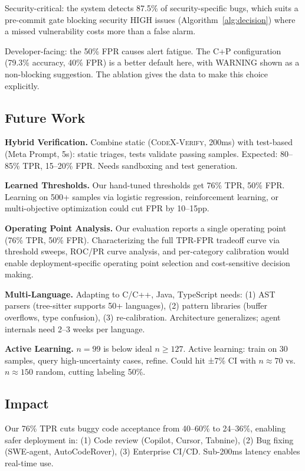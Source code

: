 \documentclass[10pt,twocolumn]{article}
\begin{document}
Security-critical: the system detects 87.5\% of security-specific bugs, which suits a pre-commit gate blocking security HIGH issues (Algorithm~\ref{alg:decision}) where a missed vulnerability costs more than a false alarm.

Developer-facing: the 50\% FPR causes alert fatigue. The C+P configuration (79.3\% accuracy, 40\% FPR) is a better default here, with WARNING shown as a non-blocking suggestion. The ablation gives the data to make this choice explicitly.

\subsection{Future Work}

\textbf{Hybrid Verification.} Combine static (\textsc{CodeX-Verify}, 200ms) with test-based (Meta Prompt, 5s): static triages, tests validate passing samples. Expected: 80--85\% TPR, 15--20\% FPR. Needs sandboxing and test generation.

\textbf{Learned Thresholds.} Our hand-tuned thresholds get 76\% TPR, 50\% FPR. Learning on 500+ samples via logistic regression, reinforcement learning, or multi-objective optimization could cut FPR by 10--15pp.

\textbf{Operating Point Analysis.} Our evaluation reports a single operating point (76\% TPR, 50\% FPR). Characterizing the full TPR-FPR tradeoff curve via threshold sweeps, ROC/PR curve analysis, and per-category calibration would enable deployment-specific operating point selection and cost-sensitive decision making.

\textbf{Multi-Language.} Adapting to C/C++, Java, TypeScript needs: (1) AST parsers (tree-sitter supports 50+ languages), (2) pattern libraries (buffer overflows, type confusion), (3) re-calibration. Architecture generalizes; agent internals need 2--3 weeks per language.

\textbf{Active Learning.} $n=99$ is below ideal $n \geq 127$. Active learning: train on 30 samples, query high-uncertainty cases, refine. Could hit ±7\% CI with $n \approx 70$ vs. $n \approx 150$ random, cutting labeling 50\%.


\subsection{Impact}

Our 76\% TPR cuts buggy code acceptance from 40--60\% to 24--36\%, enabling safer deployment in: (1) Code review (Copilot, Cursor, Tabnine), (2) Bug fixing (SWE-agent, AutoCodeRover), (3) Enterprise CI/CD. Sub-200ms latency enables real-time use.
\end{document}
